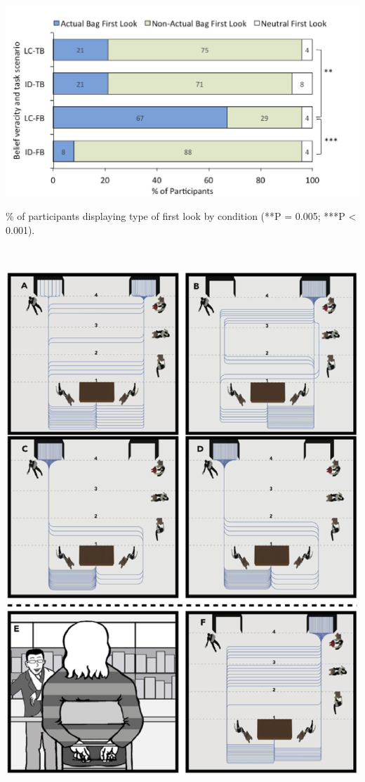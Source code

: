 \documentclass[12pt]{extarticle}
\begin{document}
\begin{multicols*}{3}
\
\begin{center}
\includegraphics[scale=0.3]{img/maymon_fig3.png}
\end{center}
\% of participants displaying type of first look by condition (**P = 0.005; ***P < 0.001).

\vfill


\ 

\columnbreak

\begin{center}
\includegraphics[scale=0.33]{img/maymon_fig4.png}
\end{center}


\end{multicols*}
\end{document}
